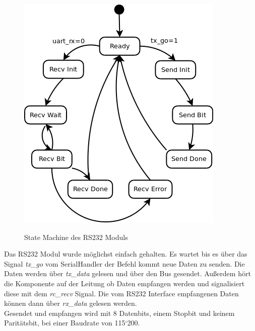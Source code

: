 \begin{figure}[!ht]
 \caption{State Machine des RS232 Moduls}
 \centering
 \includegraphics[scale=0.55]{pics/RS232.png}
 \label{fig:Modules}
\end{figure}

Das RS232 Modul wurde möglichst einfach gehalten. Es wartet bis es über das Signal 
\textit{tx\_go} vom SerialHandler der Befehl kommt neue Daten zu senden. Die Daten
werden über \textit{tx\_data} gelesen und über den Bus gesendet. Außerdem
hört die Komponente auf der Leitung ob Daten empfangen werden und signalisiert diese 
mit dem \textit{rc\_recv} Signal. Die vom RS232 Interface empfangenen Daten können 
dann über \textit{rx\_data} gelesen werden.\\
Gesendet und empfangen wird mit 8 Datenbits, einem Stopbit und keinem Paritätsbit, bei einer
Baudrate von 115`200.
